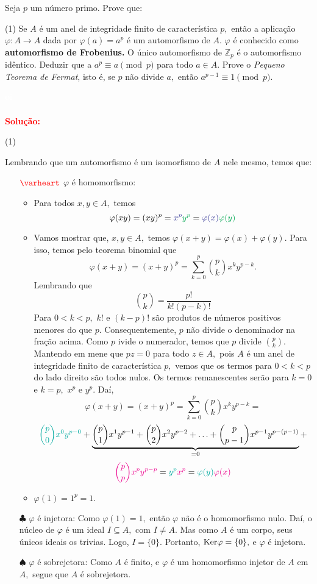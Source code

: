 \documentclass[11pt,a4paper]{article}
\newcounter{exercicio}[section]
\newcommand{\dividiritens}[1]{\begin{tasks}[counter-format={(tsk[a])},label-width=3.6ex, label-format = {\bfseries}, column-sep = {0pt}](1) #1 \end{tasks}}
\newcommand{\pers}[1]{\textcolor{Floresta}{$\negrito{(#1)} $}}
\newcommand{\solucao}[1]{
\textbf{\textcolor{white}{oi}\\ \\ \textcolor{red}{Solução:}} #1}
\begin{document}
 Seja $p$ um número primo. Prove que:\dividiritens{
\task[\pers{a}] Se $A$ é um anel de integridade finito de característica $p,$ então a aplicação $\varphi \colon A \to A$ dada por $\varphi(a) = a^p$ é um automorfismo de $A.$  $\varphi$ é conhecido como \textbf{automorfismo de Frobenius.}
\task[\pers{b}] O único automorfismo de $\mathbb{Z}_p$ é o automorfismo idêntico. Deduzir que a $a^p \equiv a \pmod p$ para todo $a \in A.$
\task[\pers{c}] Prove o \emph{Pequeno Teorema de Fermat}, isto é, se $p$ não divide $a,$ então $a^{p-1} \equiv 1 \pmod p.$
}
\solucao{
\dividiritens{
\task[\pers{a}]
}
Lembrando que um automorfismo é um isomorfismo de $A$ nele mesmo, temos que:
\begin{itemize}
\item[$\textcolor{red}{\varheart}$] $\varphi$ é homomorfismo:
\begin{itemize}
\item  Para todos $x, y \in A,$ temos 
\[
\varphi(xy) = (xy)^p = \textcolor{Blue}{x^p}\textcolor{Green}{y^p} = \textcolor{Blue}{\varphi(x)}\textcolor{Green}{\varphi(y)}
\]
\item Vamos mostrar que, $x, y \in A,$ temos $\varphi(x+y) = \varphi(x) + \varphi(y).$ Para isso, temos pelo teorema binomial que
\[
\varphi(x + y) = (x+y)^p = \sum\limits_{k=0}^p \binom{p}{k} x^k y^{p-k}.
\]
Lembrando que
\[
\binom{p}{k} = \frac{p!}{k!(p-k)!}
\]
Para $0 < k < p,$ $k!$ e $(k-p)!$ são produtos de números positivos menores do que $p.$ Consequentemente, $p$ não divide o denominador na fração acima. Como $p$ ivide o numerador, temos que $p$ divide $\binom{p}{k}.$ Mantendo em mene que $pz = 0$ para todo $z \in A,$ pois $A$ é um anel de integridade finito de característica $p,$ vemos que os termos para $0 < k< p$ do lado direito são todos nulos. Os termos remanescentes serão para $k = 0$ e $k = p,$ $x^p$ e $y^p.$ Daí,
\[
\varphi(x + y) = (x+y)^p = \sum\limits_{k=0}^p \binom{p}{k} x^k y^{p-k} =\]\[ \textcolor{Emerald}{\binom{p}{0} x^0y^{p-0}} + \underbrace{\binom{p}{1} x^1y^{p-1} + \binom{p}{2} x^2y^{p-2} + \ldots + \binom{p}{p-1} x^{p-1}y^{p-(p-1)}}_{ = 0} + \]\[\textcolor{Magenta}{\binom{p}{p} x^py^{p-p}} = \textcolor{Emerald}{y^p} \textcolor{Magenta}{x^p} = \textcolor{Emerald}{\varphi(y)} \textcolor{Magenta}{\varphi(x)} 
\]

\item $\varphi(1) = 1^p = 1.$
\end{itemize}
\item[$\clubsuit$] $\varphi$ é injetora: Como $\varphi(1) = 1,$ então $\varphi$ não é o homomorfismo nulo. Daí, o núcleo de $\varphi$ é um ideal $I \subseteq A,$ com $I \neq A.$ Mas como $A$ é um corpo, seus únicos ideais os  trivias. Logo, $I = \{ 0 \}.$ Portanto, ${\rm Ker} \varphi = \{ 0 \},$ e $\varphi$ é injetora.
\item[$\spadesuit$] $\varphi$ é sobrejetora: Como $A$ é finito, e $\varphi$ é um homomorfismo injetor de $A$ em $A,$ segue que $A$ é sobrejetora.
\end{itemize}

}
\end{document}
